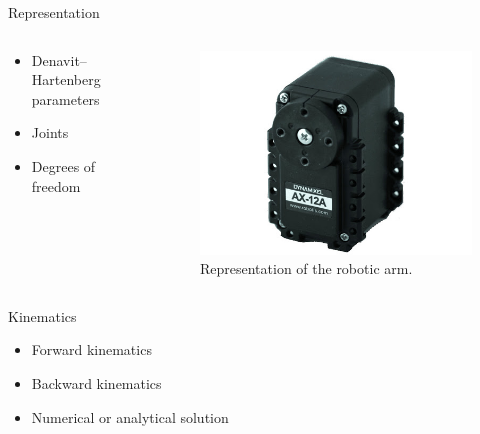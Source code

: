 \documentclass{beamer}
\begin{document}


\begin{frame}{Representation}

    \begin{columns}
        \begin{column}[]{0.5\textwidth}
            \begin{itemize}
                \item Denavit–Hartenberg parameters
                \item Joints
                \item Degrees of freedom
            \end{itemize}
        \end{column}
        
        
        \begin{column}[]{0.5\textwidth}
            \begin{figure}
                \centering
                \includegraphics[width = \textwidth]{img/ax12a.jpg}
                \caption{Representation of the robotic arm.}
                \label{fig:my_label}
            \end{figure}
            
        \end{column}
    \end{columns}
    
\end{frame}




\begin{frame}{Kinematics}

    \begin{itemize}
        \item Forward kinematics
        \item Backward kinematics
        \item Numerical or analytical solution
    \end{itemize}
\end{frame}
\end{document}

